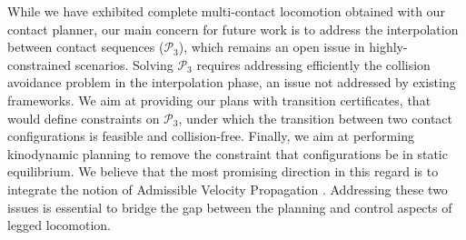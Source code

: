 While we have exhibited complete multi-contact locomotion obtained with our contact planner, our main concern for future work is to address the interpolation
between contact sequences ($\mathcal{P}_3$), which remains an open issue in highly-constrained scenarios.
Solving $\mathcal{P}_3$ requires addressing efficiently the collision avoidance problem in the interpolation phase, an issue 
not addressed by existing frameworks. We aim at providing our plans with transition certificates, that would define constraints on $\mathcal{P}_3$, under which
the transition between two contact configurations is feasible and collision-free.
Finally, we aim at performing kinodynamic planning to remove the constraint that configurations be in static equilibrium. We believe that the most promising direction in this regard is to integrate the notion of Admissible Velocity Propagation \citep{DBLP:conf/rss/PhamCN13}.
Addressing these two issues is essential to bridge the gap between the planning and control aspects of legged locomotion.
